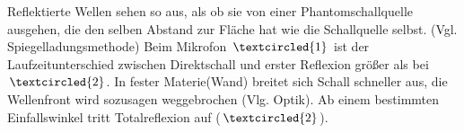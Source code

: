 \documentclass[fs, footer]{latex4ei}
\begin{document}
\begin{multicols}{4}
{	Reflektierte Wellen sehen so aus, als ob sie von einer Phantomschallquelle ausgehen, die den selben Abstand zur Fläche hat wie die Schallquelle selbst. (Vgl. Spiegelladungsmethode)
	Beim Mikrofon $\textcircled{\small 1}$ ist der Laufzeitunterschied zwischen Direktschall und erster Reflexion größer als bei $\textcircled{\small 2}$.
	In fester Materie(Wand) breitet sich Schall schneller aus, die Wellenfront wird sozusagen weggebrochen (Vlg. Optik). Ab einem bestimmten Einfallswinkel tritt Totalreflexion auf ($\textcircled{\small 2}$).

}

\end{multicols}
\end{document}
